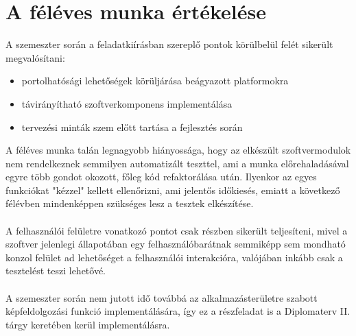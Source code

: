 \chapter{A féléves munka értékelése}

A szemeszter során a feladatkiírásban szereplő pontok körülbelül felét sikerült megvalósítani:
\begin{itemize}
\item portolhatósági lehetőségek körüljárása beágyazott platformokra
\item távirányítható szoftverkomponens implementálása
\item tervezési minták szem előtt tartása a fejlesztés során
\end{itemize}

A féléves munka talán legnagyobb hiányossága, hogy az elkészült szoftvermodulok nem rendelkeznek semmilyen automatizált teszttel, ami a munka előrehaladásával egyre több gondot okozott, főleg kód refaktorálása után. Ilyenkor az egyes funkciókat "kézzel" kellett ellenőrizni, ami jelentős időkiesés, emiatt a következő félévben mindenképpen szükséges lesz a tesztek elkészítése. \\
\\
A felhasználói felületre vonatkozó pontot csak részben sikerült teljesíteni, mivel a szoftver jelenlegi állapotában egy felhasználóbarátnak semmiképp sem mondható konzol felület ad lehetőséget a felhasználói interakcióra, valójában inkább csak a tesztelést teszi lehetővé. \\
\\
A szemeszter során nem jutott idő továbbá az alkalmazásterületre szabott képfeldolgozási funkció implementálására, így ez a részfeladat is a Diplomaterv II. tárgy keretében kerül implementálásra.